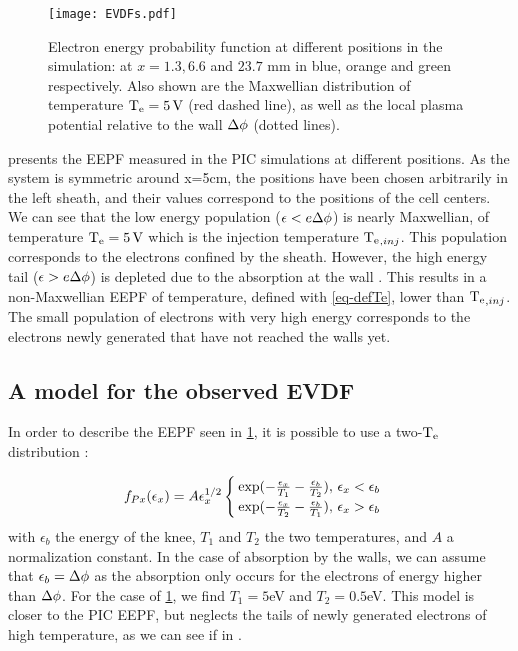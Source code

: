     \begin{figure}[!htbp]
      \centering
      \texttt{[image: EVDFs.pdf]}
      \caption{Electron energy probability function at different positions in the simulation\string: at $x=1.3,6.6$ and $23.7$ mm in blue, orange and green respectively. Also shown are the Maxwellian distribution of temperature $\mathrm{T_e}=5{\mathrm{\,V}}$ (red dashed line), as well as the local plasma potential relative to the wall $\Delta \phi$ (dotted lines). }

      \label{fig-PIC2}
    \end{figure}

     presents the EEPF measured in the PIC simulations at different positions.
    As the system is symmetric around x=5cm, the positions have been chosen arbitrarily in the left sheath, and their values correspond to the positions of the cell centers.
    We can see that the low energy population ($\epsilon < e \Delta \phi$) is nearly Maxwellian, of temperature $\mathrm{T_e} = 5{\mathrm{\,V}}$ which is the injection temperature $\mathrm{T_e}_{, inj}$.
    This population corresponds to the electrons confined by the sheath.
    However, the high energy tail ($\epsilon > e\Delta \phi$) is depleted due to the absorption at the wall \citep{meige2006a,kaganovich2007,lafleur2011}.
    This results in a  non-Maxwellian EEPF of temperature, defined with \cref{eq-defTe}, lower than $\mathrm{T_e}_{, inj}$.
    The small population of electrons with very high energy corresponds to the electrons newly generated that have not reached the walls yet.



  \subsection{A model for the observed EVDF}
    \label{sec-twoTe}
    In order to describe the  EEPF seen in \cref{fig-PIC2}, it is possible to use a two-$\mathrm{T_e}$ distribution \citep{lafleur2011,mouchtouris2016, zhang2016}\string:

    \begin{equation}
      f_{Px}(\epsilon_x) = A \epsilon_x^{1/2}
    \begin{cases}
      \exp( - \frac{\epsilon_x}{T_1} -  \frac{\epsilon_b }{T_2}) , \, \epsilon_x < \epsilon_b \\
      \exp( - \frac{\epsilon_x}{T_2} - \frac{\epsilon_b }{T_1} ) , \, \epsilon_x > \epsilon_b
    \end{cases}
    \end{equation}
    with $\epsilon_b$ the energy of the knee, $T_1$ and $T_2$ the two temperatures, and $A$ a normalization constant.
    In the case of absorption by the walls, we can assume that $\epsilon_b = \Delta \phi$ as the absorption only occurs for the electrons of energy higher than $\Delta \phi$.
    For the case of \cref{fig-PIC2}, we find $T_{1}=5$eV and $T_2=0.5$eV.
    This model is closer to the \ac{PIC} EEPF, but neglects the tails of newly generated electrons of high temperature, as we can see if in .


